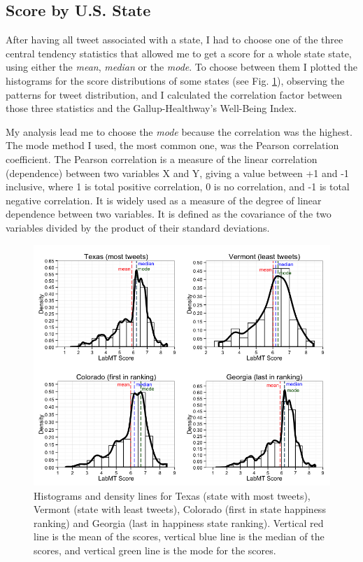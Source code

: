\documentclass{llncs}
\begin{document}
\subsection{Score by U.S. State}
\label{sec:meth4}

After having all tweet associated with a state, I had to choose one of the three central tendency statistics that allowed me to get a score for a whole state state, using either the \emph{mean}, \emph{median} or the \emph{mode}. To choose between them I plotted the histograms for the score distributions of some states (see Fig. \ref{fig:tweets_distribution}), observing the patterns for tweet distribution, and I calculated the correlation factor between those three statistics and the Gallup-Healthway's Well-Being Index.

My analysis lead me to choose the \emph{mode} because the correlation was the highest. The mode method I used, the most common one, was the Pearson correlation coefficient. The Pearson correlation is a measure of the linear correlation (dependence) between two variables X and Y, giving a value between +1 and -1 inclusive, where 1 is total positive correlation, 0 is no correlation, and -1 is total negative correlation. It is widely used as a measure of the degree of linear dependence between two variables. It is defined as the covariance of the two variables divided by the product of their standard deviations. \cite{Pearson2006}

\begin{figure}
\centering
\includegraphics[width=\textwidth]{images/tweets_distribution}
\caption{Histograms and density lines for Texas (state with most tweets), Vermont (state with least tweets), Colorado (first in state happiness ranking) and Georgia (last in happiness state ranking). Vertical red line is the mean of the scores, vertical blue line is the median of the scores, and vertical green line is the mode for the scores.}
\label{fig:tweets_distribution}
\end{figure}
\end{document}
